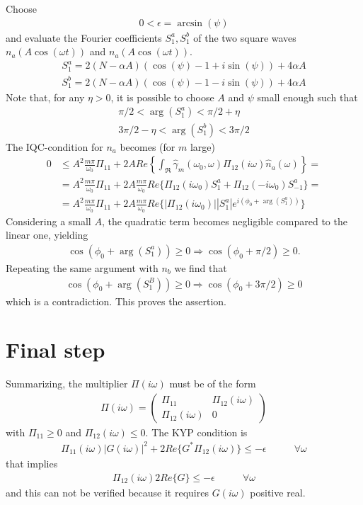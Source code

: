 \documentclass[a4paper,10pt]{article}
\newcommand{\w}{\omega}
\newcommand{\real}{Re}
\newcommand{\eps}{\epsilon}
\begin{document}
Choose 
\begin{align}
	0<\eps=\arcsin(\psi)
\end{align}
and evaluate the Fourier coefficients $S_1^{a}, S_1^{b}$ of the two square waves $n_a(A\cos(\w t))$ and $n_a(A\cos(\w t))$.
\begin{align}
	S_1^{a}=2(N-\alpha A)(\cos(\psi)-1+i\sin(\psi))+4\alpha A \\
	S_1^{b}=2(N-\alpha A)(\cos(\psi)-1-i\sin(\psi))+4\alpha A
\end{align}
Note that, for any $\eta>0$, it is possible to choose $A$ and $\psi$ small enough such that 
\begin{align}
 	\pi/2 < \arg(S_1^{a}) < \pi/2+\eta\\
	3\pi/2-\eta < \arg(S_1^{b}) < 3\pi/2
\end{align}
The IQC-condition for $n_a$ becomes (for $m$ large)
\begin{align}
	0&\leq A^2\frac{m\pi}{\w_0}\Pi_{11} +
		2A\real\left\{\int_{\Re}\hat\gamma_m(\w_0,\w)\Pi_{12}(i\w)\hat n_{a}(\w)
			\right\}=\\
	&= A^2\frac{m\pi}{\w_0}\Pi_{11} +
		2A\frac{m\pi}{\w_0}\real\{\Pi_{12}(i\w_0)S_1^a+ \Pi_{12}(-i\w_0)S_{-1}^a\}=\\
	&= A^2\frac{m\pi}{\w_0}\Pi_{11} + 
		2A\frac{m\pi}{\w_0}\real\{|\Pi_{12}(i\w_0)||S_1^a|e^{i(\phi_0+\arg(S_1^a))}\}
\end{align}
Considering a small $A$, the quadratic term becomes negligible compared to the linear one, yielding 
\begin{align}
	\cos(\phi_0+\arg(S_1^a))\geq 0\Rightarrow \cos(\phi_0+\pi/2)\geq 0.
\end{align}
Repeating the same argument with $n_b$ we find that
\begin{align}
	\cos(\phi_0+\arg(S_1^B))\geq 0 \Rightarrow \cos(\phi_0+3\pi/2)\geq 0
\end{align}
which is a contradiction. This proves the assertion.

\section{Final step}
Summarizing, the multiplier $\Pi(i\w)$ must be of the form
\begin{align}
	\Pi(i\w)=
		\left(\begin{array}{cc}
			\Pi_{11}	& \Pi_{12}(i\w)\\
			\Pi_{12}(i\w)	& 0
		\end{array}\right)
\end{align}
with $\Pi_{11}\geq 0$ and $\Pi_{12}(i\w)\leq 0$.
The KYP condition is
\begin{align}
\Pi_{11}(i\w) |G(i\w)|^2 +2\real\{G^* \Pi_{12}(i\w)\}\leq -\eps
			& \qquad \forall \w
\end{align}
that implies
\begin{align}
	\Pi_{12}(i\w) 2\real\{G \} \leq -\eps & \qquad \forall \w
\end{align}
and this can not be verified because it requires $G(i\w)$ positive real.
\end{document}
